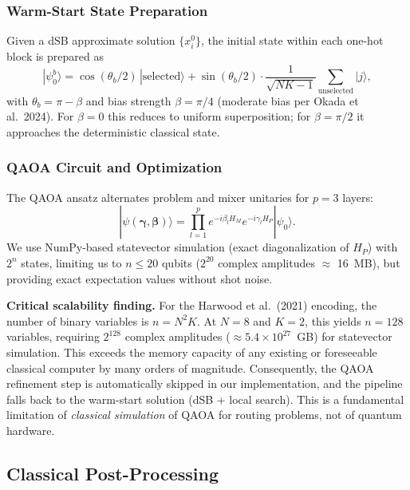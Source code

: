 \documentclass[11pt,a4paper]{article}
\theoremstyle{definition}
\begin{document}
\subsubsection{Warm-Start State Preparation}

Given a dSB approximate solution $\{x_i^0\}$, the initial state within each one-hot block is prepared as
\begin{equation}
    |\psi_0^b\rangle = \cos(\theta_b/2)\,|\text{selected}\rangle + \sin(\theta_b/2) \cdot \frac{1}{\sqrt{NK-1}} \sum_{\text{unselected}} |j\rangle,
\end{equation}
with $\theta_b = \pi - \beta$ and bias strength $\beta = \pi/4$ (moderate bias per Okada et al.\ 2024). For $\beta=0$ this reduces to uniform superposition; for $\beta=\pi/2$ it approaches the deterministic classical state.

\subsubsection{QAOA Circuit and Optimization}

The QAOA ansatz alternates problem and mixer unitaries for $p=3$ layers:
\begin{equation}
    |\psi(\boldsymbol{\gamma}, \boldsymbol{\beta})\rangle = \prod_{l=1}^{p} e^{-i\beta_l H_M} e^{-i\gamma_l H_P} |\psi_0\rangle.
\end{equation}
We use NumPy-based statevector simulation (exact diagonalization of $H_P$) with $2^n$ states, limiting us to $n \leq 20$ qubits ($2^{20}$ complex amplitudes $\approx$ 16~MB), but providing exact expectation values without shot noise.

\textbf{Critical scalability finding.} For the Harwood et al.\ (2021) encoding, the number of binary variables is $n = N^2 K$. At $N=8$ and $K=2$, this yields $n=128$ variables, requiring $2^{128}$ complex amplitudes ($\approx 5.4 \times 10^{27}$~GB) for statevector simulation. This exceeds the memory capacity of any existing or foreseeable classical computer by many orders of magnitude. Consequently, the QAOA refinement step is automatically skipped in our implementation, and the pipeline falls back to the warm-start solution (dSB + local search). This is a fundamental limitation of \emph{classical simulation} of QAOA for routing problems, not of quantum hardware.

\subsection{Classical Post-Processing}
\end{document}
